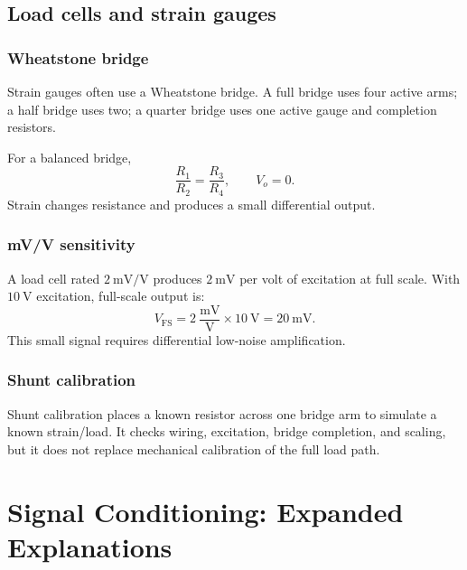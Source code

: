 \documentclass[11pt]{article}
\newcommand{\mV}{\mathrm{mV}}
\newcommand{\V}{\mathrm{V}}
\begin{document}
\subsection{Load cells and strain gauges}
\subsubsection{Wheatstone bridge}
Strain gauges often use a Wheatstone bridge. A full bridge uses four active arms;
a half bridge uses two; a quarter bridge uses one active gauge and completion
resistors.

\begin{center}
\end{center}

For a balanced bridge,
\[
\frac{R_1}{R_2} = \frac{R_3}{R_4}, \qquad V_o = 0.
\]
Strain changes resistance and produces a small differential output.

\subsubsection{mV/V sensitivity}
A load cell rated \(2~\mV/\V\) produces \(2~\mV\) per volt of excitation at full
scale. With \(10~\V\) excitation, full-scale output is:
\[
V_{\mathrm{FS}} = 2~\frac{\mV}{\V}\times 10~\V = 20~\mV.
\]
This small signal requires differential low-noise amplification.

\subsubsection{Shunt calibration}
Shunt calibration places a known resistor across one bridge arm to simulate a
known strain/load. It checks wiring, excitation, bridge completion, and scaling,
but it does not replace mechanical calibration of the full load path.

\section{Signal Conditioning: Expanded Explanations}
\end{document}
